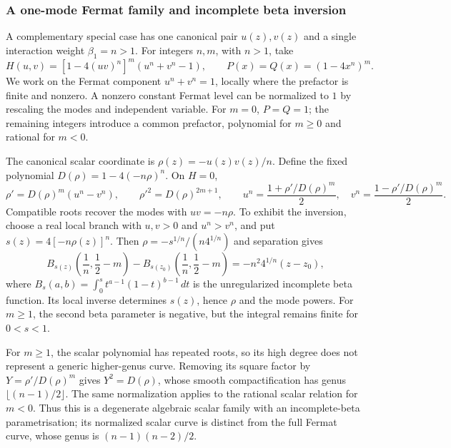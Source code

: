 \documentclass[11pt,a4paper]{article}
\numberwithin{equation}{section}
\begin{document}
\subsubsection{A one-mode Fermat family and incomplete beta inversion}
\label{sec:fermat-beta-example}

A complementary special case has one canonical pair $u(z),v(z)$ and a single interaction weight $\beta_1=n>1$. For integers $n,m$, with $n>1$, take
\begin{equation}
    H(u,v)=\left[1-4(uv)^n\right]^m\left(u^n+v^n-1\right),
    \qquad P(x)=Q(x)=(1-4x^n)^m.
    \label{eq:fermat-beta-hamiltonian}
\end{equation}
We work on the Fermat component $u^n+v^n=1$, locally where the prefactor is finite and nonzero. A nonzero constant Fermat level can be normalized to $1$ by rescaling the modes and independent variable. For $m=0$, $P=Q=1$; the remaining integers introduce a common prefactor, polynomial for $m\ge0$ and rational for $m<0$.

The canonical scalar coordinate is $\rho(z)=-u(z)v(z)/n$. Define the fixed polynomial $D(\rho)=1-4(-n\rho)^n$. On $H=0$,
\begin{equation}
    \rho'=D(\rho)^m(u^n-v^n),\qquad
    \rho'^2=D(\rho)^{2m+1},\qquad
    u^n=\frac{1+\rho'/D(\rho)^m}{2},\quad
    v^n=\frac{1-\rho'/D(\rho)^m}{2}.
    \label{eq:fermat-beta-scalar}
\end{equation}
Compatible roots recover the modes with $uv=-n\rho$. To exhibit the inversion, choose a real local branch with $u,v>0$ and $u^n>v^n$, and put $s(z)=4[-n\rho(z)]^n$. Then $\rho=-s^{1/n}/(n4^{1/n})$ and separation gives
\begin{equation}
    B_{s(z)}\left(\frac1n,\frac12-m\right)
    -B_{s(z_0)}\left(\frac1n,\frac12-m\right)
    =-n^2 4^{1/n}(z-z_0),
    \label{eq:fermat-incomplete-beta-inversion}
\end{equation}
where $B_s(a,b)=\int_0^s t^{a-1}(1-t)^{b-1}\,dt$ is the unregularized incomplete beta function. Its local inverse determines $s(z)$, hence $\rho$ and the mode powers. For $m\ge1$, the second beta parameter is negative, but the integral remains finite for $0<s<1$.

For $m\ge1$, the scalar polynomial has repeated roots, so its high degree does not represent a generic higher-genus curve. Removing its square factor by $Y=\rho'/D(\rho)^m$ gives $Y^2=D(\rho)$, whose smooth compactification has genus $\lfloor(n-1)/2\rfloor$. The same normalization applies to the rational scalar relation for $m<0$. Thus this is a degenerate algebraic scalar family with an incomplete-beta parametrisation; its normalized scalar curve is distinct from the full Fermat curve, whose genus is $(n-1)(n-2)/2$.
\end{document}
